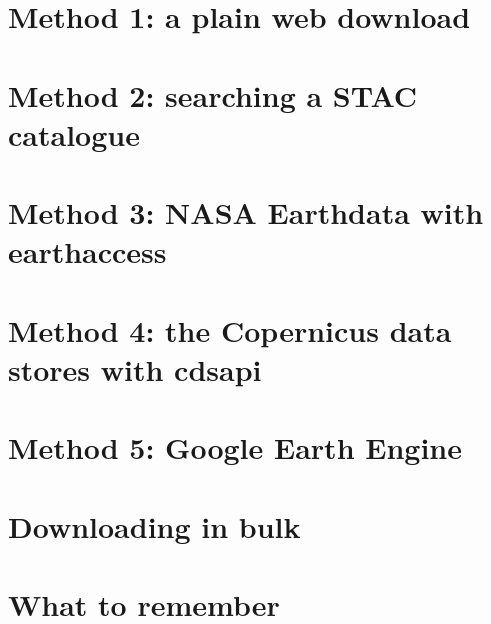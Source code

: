 \section{Method 1: a plain web download}


\section{Method 2: searching a STAC catalogue}


\section{Method 3: NASA Earthdata with earthaccess}


\section{Method 4: the Copernicus data stores with cdsapi}


\section{Method 5: Google Earth Engine}


\section{Downloading in bulk}


\section{What to remember}

